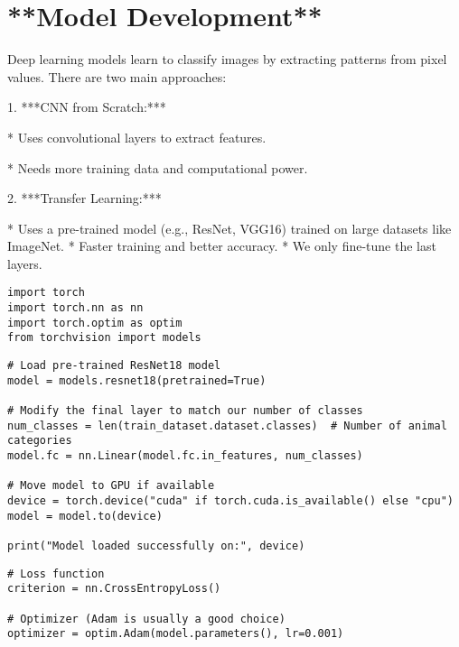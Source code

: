 \section{**Model Development**}

Deep learning models learn to classify images by extracting patterns from pixel values. There are two main approaches:

1. ***CNN from Scratch:***

*  Uses convolutional layers to extract features.

*  Needs more training data and computational power.

2.  ***Transfer Learning:***

*  Uses a pre-trained model (e.g., ResNet, VGG16) trained on large datasets like ImageNet.
*  Faster training and better accuracy.
*  We only fine-tune the last layers.

\begin{verbatim}
import torch
import torch.nn as nn
import torch.optim as optim
from torchvision import models
\end{verbatim}

\begin{verbatim}
# Load pre-trained ResNet18 model
model = models.resnet18(pretrained=True)

# Modify the final layer to match our number of classes
num_classes = len(train_dataset.dataset.classes)  # Number of animal categories
model.fc = nn.Linear(model.fc.in_features, num_classes)

# Move model to GPU if available
device = torch.device("cuda" if torch.cuda.is_available() else "cpu")
model = model.to(device)

print("Model loaded successfully on:", device)

\end{verbatim}

\begin{verbatim}
# Loss function
criterion = nn.CrossEntropyLoss()

# Optimizer (Adam is usually a good choice)
optimizer = optim.Adam(model.parameters(), lr=0.001)
\end{verbatim}

